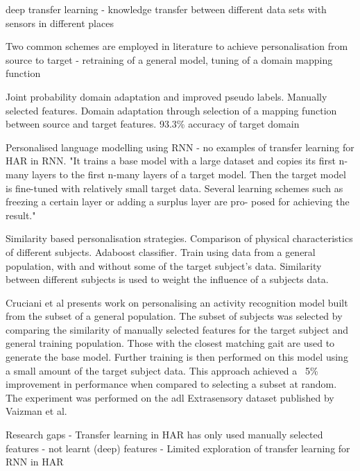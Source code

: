 deep transfer learning - knowledge transfer between different data sets with sensors in different places\cite{Wang2018a}

Two common schemes are employed in literature to achieve personalisation from source to target - retraining of a general model, tuning of a domain mapping function

Joint probability domain adaptation and improved pseudo labels\cite{Fu2021}. Manually selected features. Domain adaptation through selection of a mapping function between source and target features. 93.3\% accuracy of target domain

Personalised language modelling using RNN - no examples of transfer learning for HAR in RNN. "It trains a base model with a large dataset and copies its first n-many layers to the first n-many layers of a target model. Then the target model is fine-tuned with relatively small target data. Several learning schemes such as freezing a certain layer or adding a surplus layer are pro- posed for achieving the result."\cite{Yoon2017}

Similarity based personalisation strategies. Comparison of physical characteristics of different subjects\cite{Ferrari2020}. Adaboost classifier. Train using data from a general population, with and without some of the target subject's data. Similarity between different subjects is used to weight the influence of a subjects data.

Cruciani et al presents work on personalising an activity recognition model built from the subset of a general population. The subset of subjects was selected by comparing the similarity of manually selected features for the target subject and general training population. Those with the closest matching gait are used to generate the base model. Further training is then performed on this model using a small amount of the target subject data. This approach achieved a ~5\% improvement in performance when compared to selecting a subset at random\cite{Cruciani2020}. The experiment was performed on the \acrshort{adl} Extrasensory dataset published by Vaizman et al\cite{Vaizman2017}.

Research gaps
- Transfer learning in HAR has only used manually selected features - not learnt (deep) features
- Limited exploration of transfer learning for RNN in HAR

